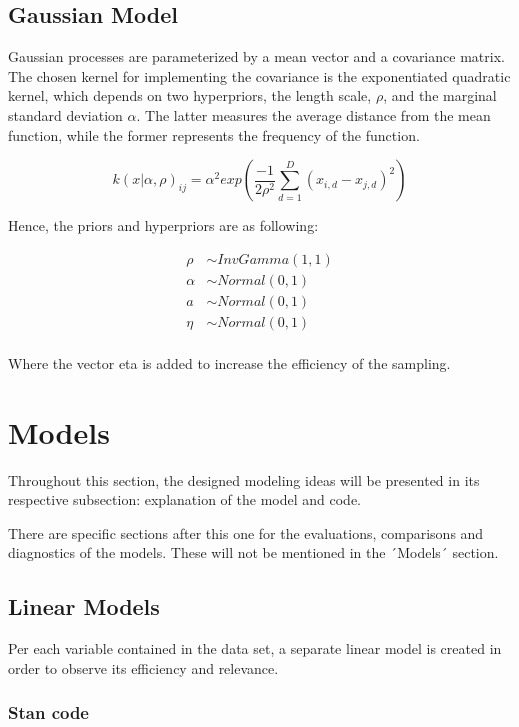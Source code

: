 \documentclass[
]{article}
\begin{document}
\hypertarget{gaussian-model}{%
\subsection{Gaussian Model}\label{gaussian-model}}

Gaussian processes are parameterized by a mean vector and a covariance
matrix. The chosen kernel for implementing the covariance is the
exponentiated quadratic kernel, which depends on two hyperpriors, the
length scale, \(\rho\), and the marginal standard deviation \(\alpha\).
The latter measures the average distance from the mean function, while
the former represents the frequency of the function.

\[
k(x|\alpha, \rho)_{ij} = \alpha^2 exp(\frac{-1}{2\rho^2}\sum_{d=1}^D(x_{i,d}-x_{j,d})^2)
\]

Hence, the priors and hyperpriors are as following:

\[
\begin{aligned}
\rho &\sim InvGamma(1,1) \\[2pt]
\alpha &\sim Normal(0,1) \\[2pt]
a &\sim Normal(0,1) \\[2pt]
\eta &\sim Normal(0,1) \\[2pt]
\end{aligned}
\]

Where the vector eta is added to increase the efficiency of the
sampling.

\hypertarget{models}{%
\section{Models}\label{models}}

Throughout this section, the designed modeling ideas will be presented
in its respective subsection: explanation of the model and code.

There are specific sections after this one for the evaluations,
comparisons and diagnostics of the models. These will not be mentioned
in the ´Models´ section.

\hypertarget{linear-models}{%
\subsection{Linear Models}\label{linear-models}}

Per each variable contained in the data set, a separate linear model is
created in order to observe its efficiency and relevance.

\hypertarget{stan-code}{%
\subsubsection{Stan code}\label{stan-code}}
\end{document}
